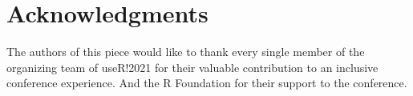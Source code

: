 \documentclass[10pt,letterpaper]{article}
\begin{document}
\section*{Acknowledgments}
The authors of this piece would like to thank every single member of the organizing team of useR!2021 for their valuable contribution to an inclusive conference experience. And the R Foundation for their support to the conference. 







\end{document}
